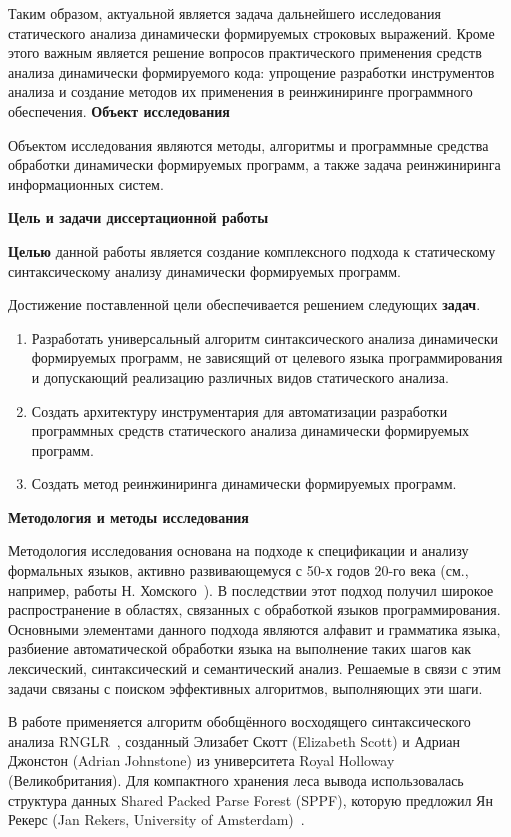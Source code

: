 Таким образом, актуальной является задача дальнейшего исследования статического анализа динамически формируемых строковых выражений. Кроме этого важным является решение вопросов практического применения средств анализа динамически формируемого кода: упрощение разработки инструментов анализа и создание методов их применения в реинжиниринге программного обеспечения.
\textbf{Объект исследования}

Объектом исследования являются методы, алгоритмы и программные средства обработки динамически формируемых программ, а также задача реинжиниринга информационных систем.

\textbf{Цель и задачи диссертационной работы}

\textbf{Целью} данной работы является создание комплексного подхода к статическому синтаксическому анализу динамически формируемых программ.

Достижение поставленной цели обеспечивается решением следующих \textbf{задач}.
\begin{enumerate}
    \item Разработать универсальный алгоритм синтаксического анализа динамически формируемых программ, не зависящий от целевого языка программирования и допускающий реализацию различных видов статического анализа. 
    \item Создать архитектуру инструментария для автоматизации разработки программных средств статического анализа динамически формируемых программ.
    \item Создать метод реинжиниринга динамически формируемых программ.
\end{enumerate}

\textbf{Методология и методы исследования}

Методология исследования основана на подходе к спецификации и анализу формальных языков, активно развивающемуся с 50-х годов 20-го века (см., например, работы Н. Хомского~\cite{chomskyMethod ,chomskySyntactic}). В последствии этот подход получил широкое распространение в областях, связанных с обработкой языков программирования.
Основными элементами данного подхода являются алфавит и грамматика языка, разбиение автоматической обработки языка на выполнение таких шагов как лексический, синтаксический и семантический анализ. Решаемые в связи с этим задачи связаны с поиском эффективных алгоритмов, выполняющих эти шаги. 

В работе применяется алгоритм обобщённого восходящего синтаксического анализа RNGLR~\cite{RNGLR}, созданный Элизабет Скотт (Elizabeth Scott) и Адриан Джонстон (Adrian Johnstone) из университета Royal Holloway (Великобритания). Для компактного хранения леса вывода использовалась структура данных Shared Packed Parse Forest (SPPF), которую предложил Ян Рекерс (Jan Rekers, University of Amsterdam)~\cite{SPPF}.

